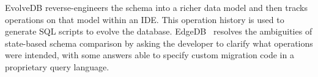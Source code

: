 \documentclass[english,submission]{programming}
\theoremstyle{definition}
\newcommand{\citet}[1]{\citeauthor*{#1}~\cite{#1}}
\begin{document}

EvolveDB\cite{evolvedb} reverse-engineers the schema into a richer data model and then tracks operations on that model within an IDE. This operation history is used to generate SQL scripts to evolve the database. EdgeDB~\cite{edgedb} resolves the ambiguities of state-based schema comparison by asking the developer to clarify what operations were intended, with some answers able to specify custom migration code in a proprietary query language.
\end{document}
